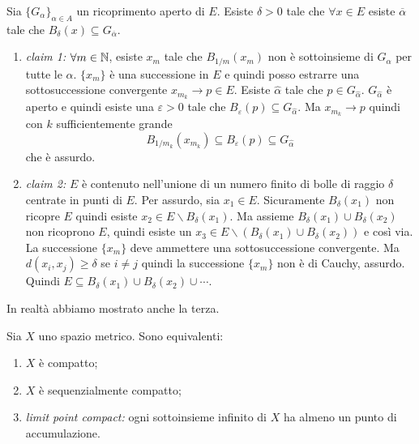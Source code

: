 \documentclass[a4paper]{article}
\begin{document}
\begin{snippetproof}{}
    Sia \(\{G_\alpha\}_{\alpha \in A}\) un ricoprimento aperto di \(E\).
    Esiste \(\delta > 0\) tale che \(\forall x \in E\) esiste \(\overline{\alpha}\)
    tale che \(B_\delta(x) \subseteq G_{\overline{\alpha}}\).
    \begin{enumerate}
        \item \emph{claim 1:} \(\forall m \in \mathbb{N}\), esiste \(x_m\) tale che
            \(B_{1/m}(x_m)\) non è sottoinsieme di \(G_\alpha\) per tutte le \(\alpha\).
            \(\{x_m\}\) è una successione in \(E\) e quindi posso estrarre una sottosuccessione convergente
            \(x_{m_k} \to p \in E\). Esiste \(\hat{\alpha}\) tale che \(p \in G_{\hat{\alpha}}\).
            \(G_{\hat{\alpha}}\) è aperto e quindi esiste una \(\varepsilon > 0\)
            tale che \(B_\varepsilon(p) \subseteq G_{\hat{\alpha}}\).
            Ma \(x_{m_k} \to p\) quindi con \(k\) sufficientemente grande
            \[B_{1/m_k}(x_{m_k}) \subseteq B_\varepsilon(p) \subseteq G_{\hat{\alpha}}\]
            che è assurdo.
        \item \emph{claim 2:} \(E\) è contenuto nell'unione di un numero finito di bolle di raggio
            \(\delta\) centrate in punti di \(E\).
            Per assurdo, sia \(x_1 \in E\). Sicuramente \(B_\delta(x_1)\)
            non ricopre \(E\) quindi esiste \(x_2 \in E \backslash B_\delta(x_1)\).
            Ma assieme \(B_\delta(x_1) \cup B_\delta(x_2)\) non ricoprono \(E\),
            quindi esiste un \(x_3 \in E \backslash (B_\delta(x_1) \cup B_\delta(x_2))\)
            e così via. La successione \(\{x_m\}\) deve ammettere una sottosuccessione
            convergente. Ma \(d(x_i, x_j) \geq \delta\) se \(i \neq j\) quindi la successione
            \(\{x_m\}\) non è di Cauchy, assurdo.
            Quindi \(E \subseteq B_\delta(x_1) \cup B_\delta(x_2) \cup \cdots\).
    \end{enumerate}
\end{snippetproof}

In realtà abbiamo mostrato anche la terza.

\begin{snippettheorem}{}
    Sia \(X\) uno spazio metrico. Sono equivalenti:
    \begin{enumerate}
        \item \(X\) è compatto;
        \item \(X\) è sequenzialmente compatto;
        \item \emph{limit point compact:} ogni sottoinsieme infinito
        di \(X\) ha almeno un punto di accumulazione.
    \end{enumerate}
\end{snippettheorem}
\end{document}
